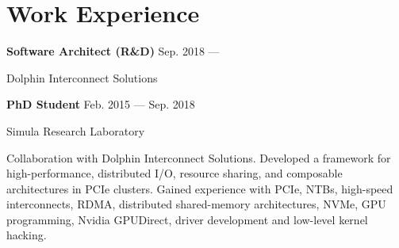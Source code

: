 \section{Work Experience}
\parbox[t][][t]{\linewidth}{
	\parbox{\linewidth}{
		\textbf{Software Architect (R\&D)}
			\hfill
			{Sep. 2018 --- \phantom{XXX. 0000}}
		}
	\smallbreak
	\parbox{\linewidth}{Dolphin Interconnect Solutions}
	\bigskip
}
\parbox[t][][t]{\linewidth}{
	{\parbox{\linewidth}{
		\parbox{\linewidth}{
			\textbf{PhD Student}
			\hfill
			{Feb. 2015 --- Sep. 2018}
		}
	}}
	\smallbreak
	\parbox{\linewidth}{Simula Research Laboratory}

	
	\bigskip
	Collaboration with Dolphin Interconnect Solutions.
	Developed a framework for high-performance, distributed I/O, resource sharing,
	and composable architectures in PCIe clusters. 
	Gained experience with PCIe, NTBs, high-speed interconnects, RDMA, distributed shared-memory
	architectures, NVMe, GPU programming, Nvidia GPUDirect, driver development and low-level kernel hacking.

}
